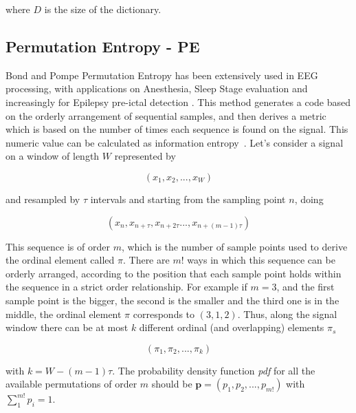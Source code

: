 \documentclass[brainsci,article,submit,moreauthors,pdftex,10pt,a4paper]{mdpi}
\begin{document}
\noindent where $D$ is the size of the dictionary.  



\subsection{Permutation Entropy - PE}

Bond and Pompe Permutation Entropy has been extensively used in EEG processing, with applications on Anesthesia, Sleep Stage evaluation and increasingly for Epilepsy pre-ictal detection \citep{Bandt2002}.  This method generates a code based on the orderly arrangement of sequential samples, and then derives a metric which is based on the number of times each sequence is found on the signal.  This numeric value can be calculated as information entropy~\citep{Nicolaou2010}. Let's consider a signal on a window of length $W$ represented by 

\begin{equation}
(x_1,x_2,...,x_{W})
\label{eq:pesignal}
\end{equation}

and resampled by $\tau$ intervals and starting from the sampling point $n$, doing

\begin{equation}
(x_n,x_{n+\tau},x_{n+2 \tau}...,x_{n+(m-1)\tau})
\label{eq:pe2}
\end{equation}

This sequence is of order $m$, which is the number of sample points used to derive the ordinal element called $\pi$. There are $m!$ ways in which this sequence can be orderly arranged, according to the position that each sample point holds within the sequence in a strict order relationship.  For example if $m=3$, and the first sample point is the bigger, the second is the smaller and the third one is in the middle, the ordinal element $\pi$ corresponds to $(3,1,2)$. Thus, along the signal window there can be at most $k$ different ordinal (and overlapping) elements $\pi_{s}$

\begin{equation}
(\pi_{1},\pi_{2},...,\pi_{k})
\label{eq:pe3}
\end{equation}

\noindent with $k = W-(m-1) \tau$.  The probability density function \textit{pdf} for all the available permutations of order $m$ should be $ \textbf{p} = (p_1,p_2,...,p_{m!}) $ with $ \sum_{1}^{m!} p_{i} = 1 $.
\end{document}
